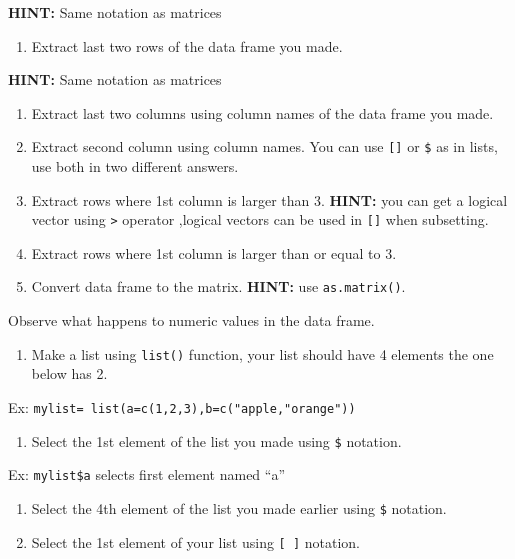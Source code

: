 \documentclass[12pt,]{krantz}
\providecommand{\tightlist}{%
  \setlength{\itemsep}{0pt}\setlength{\parskip}{0pt}}
\begin{document}
\textbf{HINT:} Same notation as matrices

\begin{enumerate}
\def\labelenumi{\arabic{enumi}.}
\setcounter{enumi}{27}
\tightlist
\item
  Extract last two rows of the data frame you made.
\end{enumerate}

\textbf{HINT:} Same notation as matrices

\begin{enumerate}
\def\labelenumi{\arabic{enumi}.}
\setcounter{enumi}{28}
\item
  Extract last two columns using column names of the data frame you made.
\item
  Extract second column using column names.
  You can use \texttt{{[}{]}} or \texttt{\$} as in lists, use both in two different answers.
\item
  Extract rows where 1st column is larger than 3.
  \textbf{HINT:} you can get a logical vector using \texttt{\textgreater{}} operator
  ,logical vectors can be used in \texttt{{[}{]}} when subsetting.
\item
  Extract rows where 1st column is larger than or equal to 3.
\item
  Convert data frame to the matrix. \textbf{HINT:} use \texttt{as.matrix()}.
\end{enumerate}

Observe what happens to numeric values in the data frame.

\begin{enumerate}
\def\labelenumi{\arabic{enumi}.}
\setcounter{enumi}{33}
\tightlist
\item
  Make a list using \texttt{list()} function, your list should have 4 elements
  the one below has 2.
\end{enumerate}

Ex: \texttt{mylist=\ list(a=c(1,2,3),b=c("apple,"orange"))}

\begin{enumerate}
\def\labelenumi{\arabic{enumi}.}
\setcounter{enumi}{34}
\tightlist
\item
  Select the 1st element of the list you made using \texttt{\$} notation.
\end{enumerate}

Ex: \texttt{mylist\$a} selects first element named ``a''

\begin{enumerate}
\def\labelenumi{\arabic{enumi}.}
\setcounter{enumi}{35}
\item
  Select the 4th element of the list you made earlier using \texttt{\$} notation.
\item
  Select the 1st element of your list using \texttt{{[}\ {]}} notation.
\end{enumerate}
\end{document}

